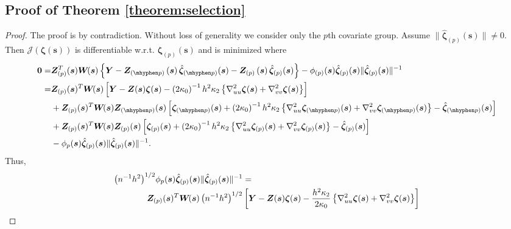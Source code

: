 \documentclass[authoryear,review, 12pt]{elsarticle}
\begin{document}
\subsection*{Proof of Theorem \ref{theorem:selection}\label{sec:gaussian-selection-proof}}
\begin{proof}
The proof is by contradiction. Without loss of generality we consider
only the $p$th covariate group. Assume $\|\hat{\bm{\zeta}}_{(p)}(\bm{s})\|\ne0$.
Then $\mathcal{J}\left(\bm{\zeta}(\bm{s})\right)$ is differentiable
w.r.t. $\bm{\zeta}_{(p)}(\bm{s})$ and is minimized where 
\begin{align*}
\bm{0}= & \bm{Z}_{(p)}^{T}(\bm{s})\bm{W}\!(\bm{s})\left\{ \bm{Y}-\bm{Z}_{(\mhyphen p)}\left(\bm{s}\right)\hat{\bm{\zeta}}_{(\mhyphen p)}(\bm{s})-\bm{Z}_{(p)}\left(\bm{s}\right)\hat{\bm{\zeta}}_{(p)}(\bm{s})\right\} -\phi_{(p)}(\bm{s})\hat{\bm{\zeta}}_{(p)}(\bm{s})\|\hat{\bm{\zeta}}_{(p)}(\bm{s})\|^{-1}\\
= & \bm{Z}_{(p)}(\bm{s})^{T}\bm{W}\!(\bm{s})\left[\bm{Y}-\bm{Z}(\bm{s})\bm{\zeta}(\bm{s})-\left(2\kappa_{0}\right)^{-1}h^{2}\kappa_{2}\left\{ \nabla_{uu}^{2}\bm{\zeta}(\bm{s})+\nabla_{vv}^{2}\bm{\zeta}(\bm{s})\right\} \right]\\
 & +\bm{Z}_{(p)}(\bm{s})^{T}\bm{W}\!(\bm{s})\bm{Z}_{(\mhyphen p)}(\bm{s})\left[\bm{\zeta}_{(\mhyphen p)}(\bm{s})+\left(2\kappa_{0}\right)^{-1}h^{2}\kappa_{2}\left\{ \nabla_{uu}^{2}\bm{\zeta}_{(\mhyphen p)}(\bm{s})+\nabla_{vv}^{2}\bm{\zeta}_{(\mhyphen p)}(\bm{s})\right\} -\hat{\bm{\zeta}}_{(\mhyphen p)}(\bm{s})\right]\\
 & +\bm{Z}_{(p)}(\bm{s})^{T}\bm{W}\!(\bm{s})\bm{Z}_{(p)}(\bm{s})\left[\bm{\zeta}_{(p)}(\bm{s})+\left(2\kappa_{0}\right)^{-1}h^{2}\kappa_{2}\left\{ \nabla_{uu}^{2}\bm{\zeta}_{(p)}(\bm{s})+\nabla_{vv}^{2}\bm{\zeta}_{(p)}(\bm{s})\right\} -\hat{\bm{\zeta}}_{(p)}(\bm{s})\right]\\
 & -\phi_{p}(\bm{s})\hat{\bm{\zeta}}_{(p)}(\bm{s})\|\hat{\bm{\zeta}}_{(p)}(\bm{s})\|^{-1}.
\end{align*}
Thus,
\begin{align}
\left(n^{-1}h^{2}\right)^{1/2} & \phi_{p}(\bm{s})\hat{\bm{\zeta}}_{(p)}(\bm{s})\|\hat{\bm{\zeta}}_{(p)}(\bm{s})\|^{-1}=\nonumber \\
 & \mkern-18mu\bm{Z}_{(p)}(\bm{s})^{T}\bm{W}\!(\bm{s})\left(n^{-1}h^{2}\right)^{1/2}\left[\bm{Y}-\bm{Z}(\bm{s})\bm{\zeta}(\bm{s})-\frac{h^{2}\kappa_{2}}{2\kappa_{0}}\left\{ \nabla_{uu}^{2}\bm{\zeta}(\bm{s})+\nabla_{vv}^{2}\bm{\zeta}(\bm{s})\right\} \right]\nonumber \\

\end{align}
\end{proof}
\end{document}
